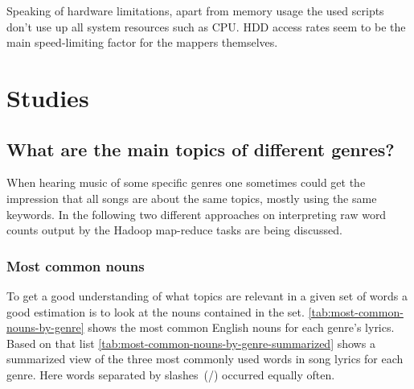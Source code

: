 \documentclass[                                                             %
        12pt,                                                                   %
        twoside                                                                 %
    ]{scrartcl}                                                                 %
\begin{document}
Speaking of hardware limitations, 
apart from memory usage the used scripts 
don't use up all system resources such as CPU.
HDD access rates seem to be the main speed-limiting factor
for the mappers themselves.

\section{Studies}

\subsection{What are the main topics of different genres?}

When hearing music of some specific genres one sometimes 
could get the impression that all songs are about the same topics,
mostly using the same keywords.
In the following two different approaches on interpreting 
raw word counts output by the Hadoop map-reduce tasks
are being discussed.

\subsubsection{Most common nouns}

To get a good understanding of what topics are relevant in a given set of words
a good estimation is to look at the nouns contained in the set.
\autoref{tab:most-common-nouns-by-genre} shows the most common English nouns 
for each genre's lyrics.
Based on that list \autoref{tab:most-common-nouns-by-genre-summarized} 
shows a summarized view of the three most commonly used words in song lyrics
for each genre. Here words separated by slashes~(/) occurred equally often.
\end{document}
